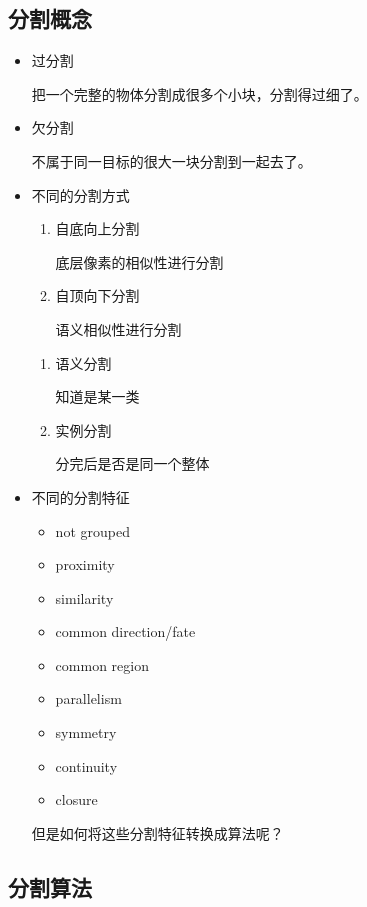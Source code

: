 \documentclass[UTF8]{ctexart}
\begin{document}
\subsection{分割概念}
\begin{itemize}
    \item 过分割
    
    把一个完整的物体分割成很多个小块，分割得过细了。
    \item 欠分割
    
    不属于同一目标的很大一块分割到一起去了。

    \item 不同的分割方式
    
    \begin{enumerate}
        \item 自底向上分割
        
        底层像素的相似性进行分割
        \item 自顶向下分割
        
        语义相似性进行分割
    \end{enumerate}

    \begin{enumerate}
        \item 语义分割
        
        知道是某一类
        \item 实例分割
        
        分完后是否是同一个整体
    \end{enumerate}

    \item 不同的分割特征
    \begin{itemize}
        \item not grouped
        \item proximity
        \item similarity
        \item common direction/fate
        \item common region
        \item parallelism
        \item symmetry
        \item continuity
        \item closure
    \end{itemize}
    但是如何将这些分割特征转换成算法呢？

\end{itemize}

\subsection{分割算法}
\end{document}
